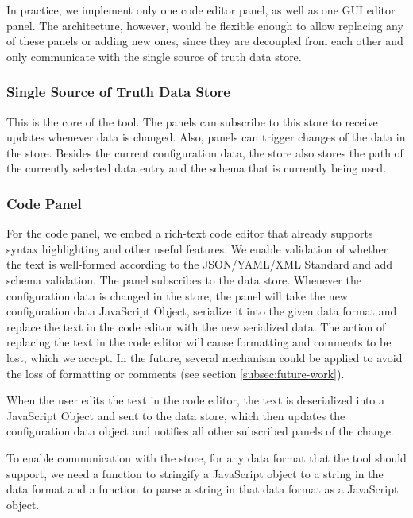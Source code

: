 In practice, we implement only one code editor panel, as well as one GUI editor panel. 
The architecture, however, would be flexible enough to allow replacing any of these panels or adding new ones, since they are decoupled from each other and only communicate with the single source of truth data store.



\subsubsection{Single Source of Truth Data Store}
This is the core of the tool.
The panels can subscribe to this store to receive updates whenever data is changed.
Also, panels can trigger changes of the data in the store.
Besides the current configuration data, the store also stores the path of the currently selected data entry and the schema that is currently being used.


\subsubsection{Code Panel}\label{subsubsec:design_text_editor_panel} 
For the code panel, we embed a rich-text code editor that already supports syntax highlighting and other useful features.
We enable validation of whether the text is well-formed according to the JSON/YAML/XML Standard and add schema validation.
The panel subscribes to the data store.
Whenever the configuration data is changed in the store, the panel will take the new configuration data JavaScript Object, serialize it into the given data format and replace the text in the code editor with the new serialized data.
The action of replacing the text in the code editor will cause formatting and comments to be lost, which we accept.
In the future, several mechanism could be applied to avoid the loss of formatting or comments (see section \ref{subsec:future-work}).

When the user edits the text in the code editor, the text is deserialized into a JavaScript Object and sent to the data store, which then updates the configuration data object and notifies all other subscribed panels of the change.


To enable communication with the store, for any data format that the tool should support, we need a function to stringify a JavaScript object to a string in the data format and a function to parse a string in that data format as a JavaScript object.


